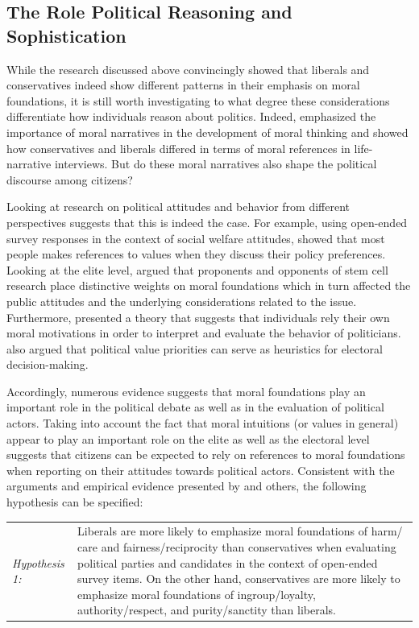 \documentclass[12pt]{article}
\begin{document}
\subsection{The Role Political Reasoning and Sophistication}

While the research discussed above convincingly showed that liberals and conservatives indeed show different patterns in their emphasis on moral foundations, it is still worth investigating to what degree these considerations differentiate how individuals reason about politics. Indeed, \citet{haidt2008moral} emphasized the importance of moral narratives in the development of moral thinking and \citet{mcadams2008family} showed how conservatives and liberals differed in terms of moral references in life-narrative interviews. But do these moral narratives also shape the political discourse among citizens?

Looking at research on political attitudes and behavior from different perspectives suggests that this is indeed the case. For example, using open-ended survey responses in the context of social welfare attitudes, \citet{feldman1992political} showed that most people makes references to values when they discuss their policy preferences. Looking at the elite level, \citet{clifford2013words} argued that proponents and opponents of stem cell research place distinctive weights on moral foundations which in turn affected the public attitudes and the underlying considerations related to the issue. Furthermore, \citet{clifford2014linking} presented a theory that suggests that individuals rely their own moral motivations in order to interpret and evaluate the behavior of politicians. \citet{marietta2007values} also argued that political value priorities can serve as heuristics for electoral decision-making.

Accordingly, numerous evidence suggests that moral foundations play an important role in the political debate as well as in the evaluation of political actors. Taking into account the fact that moral intuitions (or values in general) appear to play an important role on the elite as well as the electoral level suggests that citizens can be expected to rely on references to moral foundations when reporting on their attitudes towards political actors. Consistent with the arguments and empirical evidence presented by \citet{graham2009liberals} and others, the following hypothesis can be specified:

\vspace{0.3cm}
\begin{tabular}{lp{12cm}}
\textsl{Hypothesis 1:} & Liberals are more likely to emphasize moral foundations of harm/ care and fairness/reciprocity  than conservatives when evaluating political parties and candidates in the context of open-ended survey items. On the other hand, conservatives are more likely to emphasize moral foundations of ingroup/loyalty, authority/respect, and purity/sanctity than liberals.
\end{tabular}
\vspace{0.5cm}
\end{document}
